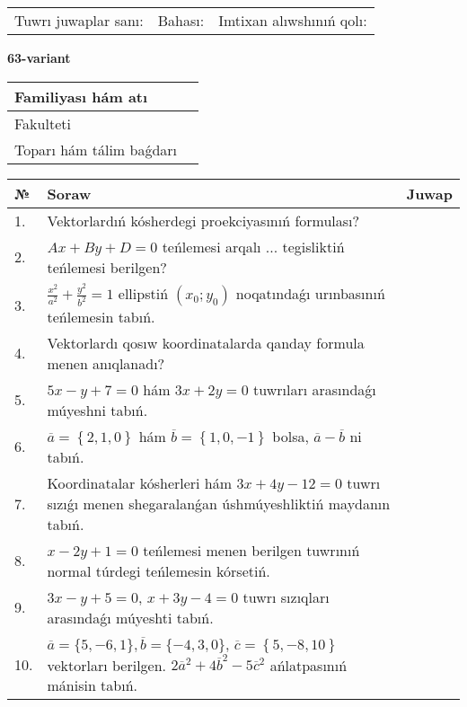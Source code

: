 \documentclass{article}
\begin{document}
\vspace{1cm}

\begin{tabular}{lll}
Tuwrı juwaplar sanı: \underline{\hspace{1.5cm}} & 
Bahası: \underline{\hspace{1.5cm}} & 
Imtixan alıwshınıń qolı: \underline{\hspace{2cm}} \\
\end{tabular}

\egroup

\newpage


\textbf{63-variant}\\

\bgroup
\def\arraystretch{1.6} %

\begin{tabular}{|m{5.7cm}|m{9.5cm}|}
\hline
Familiyası hám atı & \\
\hline
Fakulteti  & \\
\hline
Toparı hám tálim baǵdarı  & \\
\hline
\end{tabular}

\vspace{1cm}

\begin{tabular}{|m{0.7cm}|m{10cm}|m{4cm}|}
\hline
№ & Soraw & Juwap \\
\hline
1. & Vektorlardıń kósherdegi proekciyasınıń formulası? &  \\
\hline
2. & $Ax+By+D=0$ teńlemesi arqalı ... tegisliktiń teńlemesi berilgen? &  \\
\hline
3. & $\frac{x^2}{a^2}+\frac{y^2}{b^2}=1$ ellipstiń $(x_0;y_0)$ noqatındaǵı urınbasınıń teńlemesin tabıń. &  \\
\hline
4. & Vektorlardı qosıw koordinatalarda qanday formula menen anıqlanadı? &  \\
\hline
5. & $5x-y+7=0$ hám $3x+2y=0$ tuwrıları arasındaǵı múyeshni tabıń. &  \\
\hline
6. & $\overline{a}=\left\{ 2, 1, 0 \right\}$ hám $\overline{b}=\left\{ 1, 0,-1 \right\}$ bolsa, $\overline{a}-\overline{b}$ ni tabıń. &  \\
\hline
7. & Koordinatalar kósherleri hám $ 3x+4y-12=0 $ tuwrı sızıǵı menen shegaralanǵan úshmúyeshliktiń maydanın tabıń. &  \\
\hline
8. & $x-2y+1=0$ teńlemesi menen berilgen tuwrınıń normal túrdegi teńlemesin kórsetiń. &  \\
\hline
9. & $3x-y+5=0$, $x+3y-4=0$ tuwrı sızıqları arasındaǵı múyeshti tabıń. &  \\
\hline
10. & $\overline{a}=\{5,-6, 1 \}, \overline{b}=\{-4, 3, 0 \} $, $\overline{c}=\left\{ 5,-8, 10 \right\}$ vektorları berilgen. $2{\overline{a}}^{2}+4{\overline{b}}^{2}-5{\overline{c}}^{2}$ ańlatpasınıń mánisin tabıń. &  \\
\hline
\end{tabular}
\end{document}
